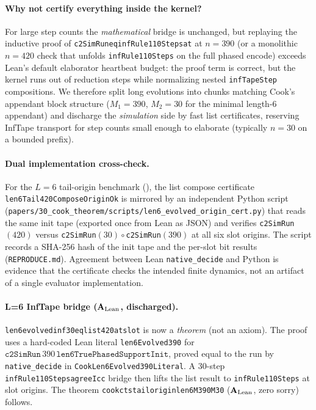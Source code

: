 \documentclass[11pt]{article}
\theoremstyle{remark}
\newcommand{\CatAL}{\ensuremath{\textbf{A}_{\rm Lean}}}
\newcommand{\lean}[1]{%
  \penalty-100
  \begingroup\def\_{\textunderscore\allowbreak}\texttt{#1}\endgroup}
\begin{document}
\paragraph{Why not certify everything inside the kernel?}
For large step counts the \emph{mathematical} bridge is unchanged, but replaying the
inductive proof of \lean{c2SimRun\_eq\_infRule110Steps\_at} at $n = 390$ (or a monolithic
$n = 420$ check that unfolds \texttt{infRule110Steps} on the full phased encode) exceeds
Lean's default elaborator heartbeat budget: the proof term is correct, but the kernel runs out
of reduction steps while normalizing nested \texttt{infTapeStep} compositions.
We therefore split long evolutions into chunks matching Cook's appendant block structure
($M_1 = 390$, $M_2 = 30$ for the minimal length-$6$ appendant) and discharge the
\emph{simulation} side by fast list certificates, reserving InfTape transport for step counts
small enough to elaborate (typically $n = 30$ on a bounded prefix).

\paragraph{Dual implementation cross-check.}
For the $L{=}6$ tail-origin benchmark (), the list compose certificate
\lean{len6Tail420ComposeOriginOk} is mirrored by an independent Python script
(\texttt{papers/30\_cook\_theorem/scripts/len6\_evolved\_origin\_cert.py}) that reads the
same init tape (exported once from Lean as JSON) and verifies
\texttt{c2SimRun}$(420)$ versus \texttt{c2SimRun}$(30)\circ$\texttt{c2SimRun}$(390)$ at all
six slot origins.
The script records a SHA-256 hash of the init tape and the per-slot bit results
(\texttt{REPRODUCE.md}).
Agreement between Lean \texttt{native\_decide} and Python is evidence that the certificate
checks the intended finite dynamics, not an artifact of a single evaluator implementation.

\paragraph{L=6 InfTape bridge ($\CatAL$, discharged).}
\lean{len6\_evolved\_inf30\_eq\_list420\_at\_slot} is now a \emph{theorem} (not an axiom).
The proof uses a hard-coded Lean literal \lean{len6Evolved390} for
$\texttt{c2SimRun}\,390\,\texttt{len6TruePhasedSupportInit}$, proved equal to the run by
\texttt{native\_decide} in \texttt{CookLen6Evolved390Literal}.
A 30-step \lean{infRule110Steps\_agree\_Icc} bridge then lifts the list result to
\texttt{infRule110Steps} at slot origins.
The theorem \lean{cook\_cts\_tail\_origin\_len6\_M390\_M30} ($\CatAL$, zero sorry) follows.
\end{document}

